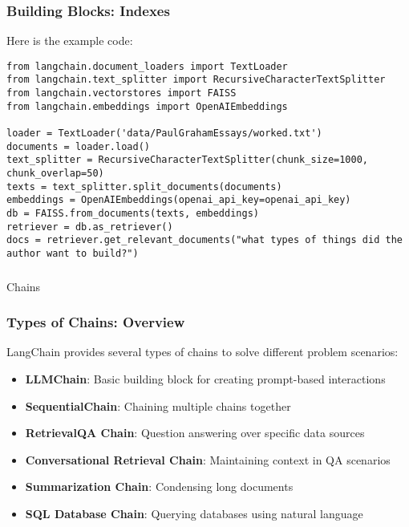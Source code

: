\begin{frame}[fragile]\frametitle{Building Blocks: Indexes}

Here is the example code:


\begin{lstlisting}
from langchain.document_loaders import TextLoader
from langchain.text_splitter import RecursiveCharacterTextSplitter
from langchain.vectorstores import FAISS
from langchain.embeddings import OpenAIEmbeddings

loader = TextLoader('data/PaulGrahamEssays/worked.txt')
documents = loader.load()
text_splitter = RecursiveCharacterTextSplitter(chunk_size=1000, chunk_overlap=50)
texts = text_splitter.split_documents(documents)
embeddings = OpenAIEmbeddings(openai_api_key=openai_api_key)
db = FAISS.from_documents(texts, embeddings)
retriever = db.as_retriever()
docs = retriever.get_relevant_documents("what types of things did the author want to build?")
\end{lstlisting}	  
\end{frame}

\begin{frame}[fragile]\frametitle{}
\begin{center}
{\Large Chains}
\end{center}
\end{frame}


\begin{frame}\frametitle{Types of Chains: Overview}

LangChain provides several types of chains to solve different problem scenarios:

\begin{itemize}
\item \textbf{LLMChain}: Basic building block for creating prompt-based interactions
\item \textbf{SequentialChain}: Chaining multiple chains together
\item \textbf{RetrievalQA Chain}: Question answering over specific data sources
\item \textbf{Conversational Retrieval Chain}: Maintaining context in QA scenarios
\item \textbf{Summarization Chain}: Condensing long documents
\item \textbf{SQL Database Chain}: Querying databases using natural language
\end{itemize}

\end{frame}

